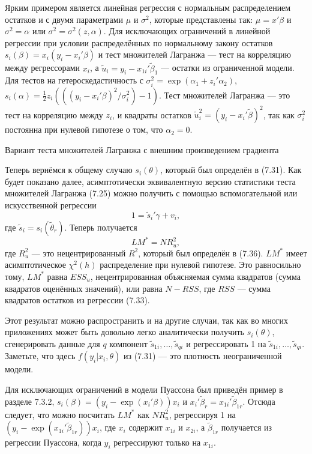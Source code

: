 Ярким примером является линейная регрессия с нормальным распределением остатков и с двумя параметрами $\mu$ и $\sigma^2$, которые представлены так: $\mu = x'\beta$ и $\sigma^2 = \alpha$ или $\sigma^2 = \sigma^2(z, \alpha)$. Для исключающих ограничений в линейной регрессии при условии распределённых по нормальному закону остатков $s_i(\beta) = x_i(y_i - x_i'\beta)$ и тест множителей Лагранжа --- тест на корреляцию между регрессорами $x_i$, а $\tilde{u}_i = y_i - x_{1i}'\tilde{\beta}_1$ --- остатки из ограниченной модели. Для тестов на гетероскедастичность с $\sigma^2_i = \exp(\alpha_1 + z_i'\alpha_2)$, $s_i(\alpha) = \frac{1}{2}z_i(((y_i - x_i'\beta)^2/\sigma^2_i) - 1)$. Тест множителей Лагранжа --- это тест на корреляцию между $z_i$, и квадраты остатков $\tilde{u}^2_i = (y_i - x_i'\tilde{\beta})^2$, так как $\sigma^2_i$ постоянна при нулевой гипотезе о том, что $\alpha_2 = 0$.

\begin{center}
Вариант теста множителей Лагранжа с внешним произведением градиента
\end{center}

Теперь вернёмся к общему случаю $s_i(\theta)$, который был определён в (7.31). Как будет показано далее, асимптотически эквивалентную версию статистики теста множителей Лагранжа (7.25) можно получить с помощью вспомогательной или искусственной регрессии
\begin{equation}
1 = \tilde{s}_i'\gamma + v_i,
\end{equation}
где $\tilde{s}_i = s_i(\tilde{\theta}_r)$. Теперь получается
\begin{equation}
LM^* = NR_u^2,
\end{equation}
где $R_u^2$ --- это нецентрированный $R^2$, который был определён в (7.36). $LM^*$ имеет асимптотическое $\chi^2(h)$ распределение при нулевой гипотезе. Это равносильно тому, $LM^*$ равна $ESS_u$, нецентрированная объясняемая сумма квадратов (сумма квадратов оценённых значений), или равна $N - RSS$, где $RSS$ --- сумма квадратов остатков из регрессии (7.33).

Этот результат можно распространить и на другие случаи, так как во многих приложениях может быть довольно легко аналитически получить $s_i(\theta)$, сгенерировать данные для $q$ компонент $\tilde{s}_{1i}, \dots,\tilde{s}_{qi}$ и регрессировать 1 на $\tilde{s}_{1i}, \dots,\tilde{s}_{qi}$. Заметьте, что здесь $f(y_i| x_i, \theta)$ из (7.31) --- это плотность неограниченной модели.

Для исключающих ограничений в модели Пуассона был приведён пример в разделе 7.3.2, $s_i(\beta) = (y_i - \exp(x_i'\beta))x_i$ и $x_i'\tilde{\beta}_r = x_{1i}'\tilde{\beta}_{1r}$. Отсюда следует, что можно посчитать $LM^*$ как $NR_u^2$, регрессируя 1 на $(y_i - \exp(x_{1i}'\tilde{\beta}_{1r}))x_i$, где $x_i$ содержит $x_{1i}$ и $x_{2i}$, а $\tilde{\beta}_{1r}$ получается из регрессии Пуассона, когда $y_i$ регрессируют только на $x_{1i}$.

